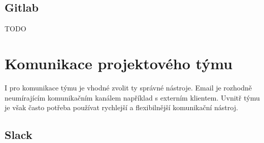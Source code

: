 \subsection{Gitlab} \label{version:gitlab}

TODO


\section{Komunikace projektového týmu}

I pro komunikace týmu je vhodné zvolit ty správné nástroje. Email je rozhodně neumírajícím komunikačním kanálem například s externím klientem. Uvnitř týmu je však často potřeba používat rychlejší a flexibilnější komunikační nástroj.

\subsection{Slack}

